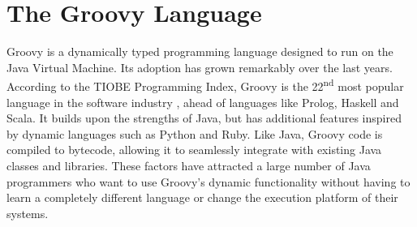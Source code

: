 \documentclass[preprint]{sigplanconf}
\begin{document}
%
%

\section{The Groovy Language\label{groovy}}
Groovy is a dynamically typed programming language designed to run on the Java Virtual Machine.
Its adoption has grown remarkably over the last years.
According to the TIOBE Programming Index, Groovy is the 22\textsuperscript{nd} most popular language in the software industry \cite{tiobe}, ahead of languages like Prolog, Haskell and Scala. 
It builds upon the strengths of Java, but has additional features inspired by dynamic languages such as Python and Ruby.
Like Java, Groovy code is compiled to bytecode, allowing it to seamlessly integrate with existing Java classes and libraries. 
These factors have attracted a large number of Java programmers who want to use Groovy's dynamic functionality without having to learn a completely different language or change the execution platform of their systems. 

\end{document}
